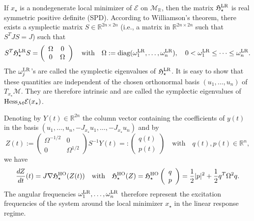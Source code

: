 \documentclass[11pt]{article}
\def\R{{\mathbb R}}
\begin{document}
If $x_\star$ is a nondegenerate local minimizer of $\mathcal E$ on $\mathcal M_\R$, then the matrix $\mathfrak H_\star^{\rm LR}$ is real symmetric positive definite (SPD). According to Williamson's theorem, \supercite{williamson1936algebraic} there exists a symplectic matrix $S \in \R^{2n \times 2n}$ (i.e., a matrix in $\R^{2n \times 2n}$ such that $S^T J S = J$) such that
\begin{equation}\label{eq:frequencies}
S^T \mathfrak H_\star^{\rm LR} S = \left( \begin{array}{cc} \Omega & 0 \\ 0 & \Omega \end{array} \right) \quad \mbox{with} \quad \Omega:=\mbox{diag}(\omega_1^{\rm LR},\ldots,\omega_n^{\rm LR}), \quad  0 < \omega_1^{\rm LR} \le  \cdots \le \omega_n^{\rm LR}.
\end{equation}
The $\omega_j^{\rm LR}$'s are called the symplectic eigenvalues of $\mathfrak H_\star^{\rm LR}$. It is easy to show that these quantities are independent of the chosen orthonormal basis $(u_1,\ldots, u_n)$ of $T_{x_\star}\mathcal M$. They are therefore intrinsic and are called the symplectic eigenvalues of ${\rm Hess}_{\mathcal M}\mathcal E(x_\star)$.

\medskip

Denoting by $Y(t) \in \R^{2n}$ the column vector containing the coefficients of $y(t)$ in the basis $(u_1,\ldots,u_n,-J_{x_\star} u_1,\ldots,-J_{x_\star} u_n)$ and by 
$$
Z(t) := \left( \begin{array}{cc} \Omega^{-1/2} & 0 \\ 0 & \Omega^{1/2} \end{array} \right) S^{-1}Y(t) =: \left( \begin{array}{c} q(t) \\ p(t) \end{array} \right) \quad \mbox{with} \quad q(t),p(t) \in \R^{n},
$$
we have
$$
\frac{dZ}{dt}(t) = J \nabla \mathfrak H^{\rm HO}_\star(Z(t)) \quad \mbox{with} \quad \mathfrak H^{\rm HO}_\star(Z)=\mathfrak H^{\rm HO}_\star\left( \begin{array}{c} q \\ p \end{array} \right) =\frac 12 |p|^2 + \frac 12 q^T \Omega^2 q.
$$
The angular frequencies $\omega_1^{\rm LR},\ldots,\omega_n^{\rm LR}$ therefore represent the excitation frequencies of the system around the local minimizer $x_\star$ in the linear response regime.

\medskip
\end{document}
